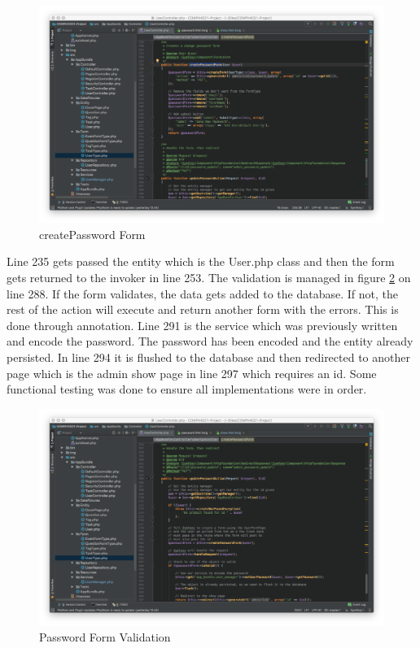 \begin{figure}[htbp]
   \centering
   \includegraphics[width=400pt]{figures/create_password_form.png} %
   \caption{createPassword Form}
   \label{fig:createPassword Form}
\end{figure}

Line 235 gets passed the entity which is the User.php class and then the form gets returned to the invoker in line 253. The validation is managed in figure \ref{fig:Password Form Validation} on line 288. If the form validates, the data gets added to the database. If not, the rest of the action will execute and return another form with the errors. This is done through annotation. Line 291 is the service which was previously written and encode the password. The password has been encoded and the entity already persisted. In line 294 it is flushed to the database and then redirected to another page which is the admin show page in line 297 which requires an id. Some functional testing was done to ensure all implementations were in order.

\begin{figure}[htbp]
   \centering
   \includegraphics[width=400pt]{figures/create_password_form_validation.png} %
   \caption{Password Form Validation}
   \label{fig:Password Form Validation}
\end{figure}

